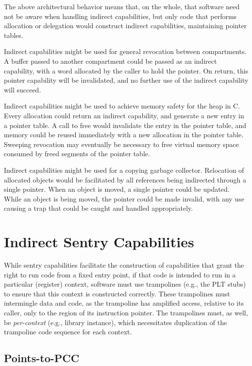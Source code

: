 The above architectural behavior means that, on the whole, that software need
not be aware when handling indirect capabilities, but only code that performs
allocation or delegation would construct indirect capabilities, maintaining
pointer tables.

Indirect capabilities might be used for general revocation between compartments.
A buffer passed to another compartment could be passed as an indirect
capability,
with a word allocated by the caller to hold the pointer.
On return, this pointer capability will be invalidated, and no further use
of the indirect capability will succeed.

Indirect capabilities might be used to achieve memory safety for the heap in C.
Every allocation could return an indirect capability, and generate a new entry
in a pointer table.
A call to free would invalidate the entry in the pointer table, and memory could
be reused immediately with a new allocation in the pointer table.
Sweeping revocation may eventually be necessary to free virtual memory space
consumed by freed segments of the pointer table.

Indirect capabilities might be used for a copying garbage collector.
Relocation of allocated objects would be facilitated by all references being
indirected through a single pointer.
When an object is moved, a single pointer could be updated.
While an object is being moved, the pointer could be made invalid, with any
use causing a trap that could be caught and handled appropriately.

\section{Indirect Sentry Capabilities} %
\label{app:exp:indsentry}

While sentry capabilities facilitate the construction of capabilities
that grant the right to run code from a fixed entry point, if that code is
intended to run in a particular (register) context, software must use
trampolines (e.g., the PLT stubs) to ensure that this context is constructed
correctly.  These trampolines must intermingle data and code, as the trampoline
has amplified access, relative to its caller, only to the region of its
instruction pointer.  The trampolines must, as well, be \emph{per-context}
(e.g., library instance), which necessitates duplication of the trampoline code
sequence for each context.

\subsection{Points-to-PCC} %

